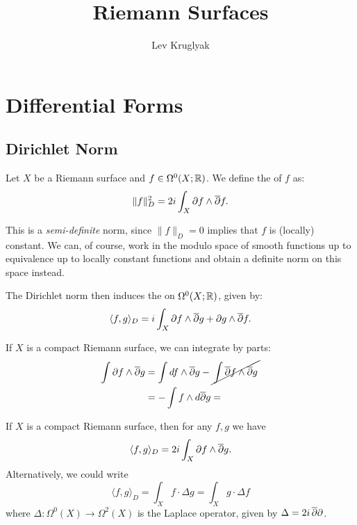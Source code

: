 \documentclass{lkx_paper}
\title{\textbf{Riemann Surfaces}}
\date{}
\author{Lev Kruglyak}
\begin{document}
\maketitle

\section{Differential Forms}


\subsection{Dirichlet Norm}

\begin{definition}
	Let $X$ be a Riemann surface and $f\in \Omega^0(X; \mathbb{R})$. We define the   of $f$ as:
	\[
		\|f\|_D^2 = 2i\int_X \partial f\wedge \overline{\partial} f.
	\]
\end{definition}

This is a \emph{semi-definite} norm, since $\|f\|_D = 0$ implies that $f$ is (locally) constant. We can, of course, work in the modulo space of smooth functions up to equivalence up to locally constant functions and obtain a definite norm on this space instead.

\begin{definition}
	The Dirichlet norm then induces the  on $\Omega^0(X; \mathbb{R})$, given by:
	\[
		\langle f, g\rangle_D = i\int_X \partial f \wedge \overline{\partial} g + \partial g\wedge \overline{\partial} f.
	\]
\end{definition}

If $X$ is a compact Riemann surface, we can integrate by parts:
\[
	\begin{aligned}
		\int \partial f \wedge \overline{\partial} g & = \int df\wedge \overline{\partial} g - \cancel{\,\int \overline{\partial} f\wedge \overline{\partial} g\,} \\
		                         & = -\int f\wedge d\overline{\partial} g =
	\end{aligned}
\]

\begin{proposition}
	If $X$ is a compact Riemann surface, then for any $f,g$ we have
	\[
		\langle f, g\rangle_D = 2i\int_X \partial f \wedge \overline{\partial} g.
	\]
	Alternatively, we could write
	\[
		\langle f, g\rangle_D = \int_X f\cdot \Delta g = \int_X g\cdot \Delta f
	\]
	where $\Delta : \Omega^0(X) \to \Omega^2(X)$ is the Laplace operator, given by $\Delta = 2i\,\overline{\partial}\partial$.
\end{proposition}
\end{document}
